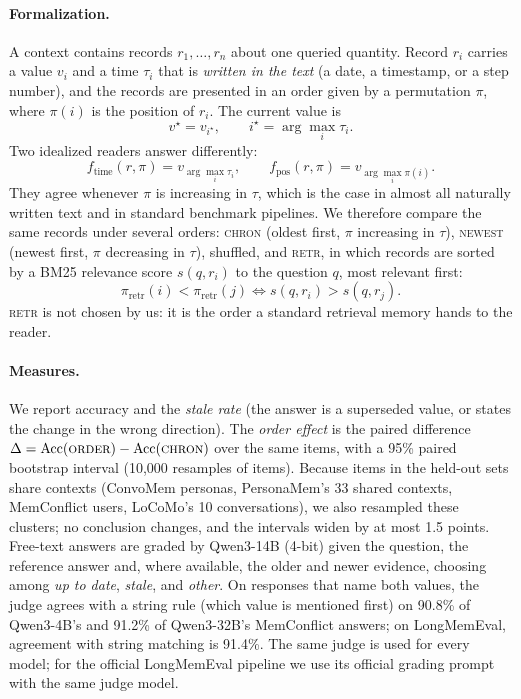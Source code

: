 \documentclass[11pt]{article}
\newcommand{\chrono}{\textsc{chron}}
\newcommand{\rev}{\textsc{newest}}
\newcommand{\retr}{\textsc{retr}}
\begin{document}
\paragraph{Formalization.}
A context contains records $r_1,\dots,r_n$ about one queried quantity. Record $r_i$ carries a value $v_i$ and a time $\tau_i$ that is \emph{written in the text} (a date, a timestamp, or a step number), and the records are presented in an order given by a permutation $\pi$, where $\pi(i)$ is the position of $r_i$. The current value is
\begin{equation}
  v^\star = v_{i^\star}, \qquad i^\star = \arg\max_i \tau_i .
\end{equation}
Two idealized readers answer differently:
\begin{equation}
  f_{\text{time}}(r,\pi) = v_{\arg\max_i \tau_i}, \qquad
  f_{\text{pos}}(r,\pi) = v_{\arg\max_i \pi(i)} .
\end{equation}
They agree whenever $\pi$ is increasing in $\tau$, which is the case in almost all naturally written text and in standard benchmark pipelines. We therefore compare the same records under several orders:
\chrono{} (oldest first, $\pi$ increasing in $\tau$), \rev{} (newest first, $\pi$ decreasing in $\tau$), shuffled, and \retr{}, in which records are sorted by a BM25 relevance score $s(q, r_i)$ to the question $q$, most relevant first:
\begin{equation}
  \pi_{\text{retr}}(i) < \pi_{\text{retr}}(j) \iff s(q,r_i) > s(q,r_j).
\end{equation}
\retr{} is not chosen by us: it is the order a standard retrieval memory hands to the reader.

\paragraph{Measures.}
We report accuracy and the \emph{stale rate} (the answer is a superseded value, or states the change in the wrong direction).
The \emph{order effect} is the paired difference $\Delta = \mathrm{Acc}(\textsc{order}) - \mathrm{Acc}(\chrono)$ over the same items, with a 95\% paired bootstrap interval (10{,}000 resamples of items). Because items in the held-out sets share contexts (ConvoMem personas, PersonaMem's 33 shared contexts, MemConflict users, LoCoMo's 10 conversations), we also resampled these clusters; no conclusion changes, and the intervals widen by at most 1.5 points.
Free-text answers are graded by Qwen3-14B (4-bit) given the question, the reference answer and, where available, the older and newer evidence, choosing among \emph{up to date}, \emph{stale}, and \emph{other}. On responses that name both values, the judge agrees with a string rule (which value is mentioned first) on 90.8\% of Qwen3-4B's and 91.2\% of Qwen3-32B's MemConflict answers; on LongMemEval, agreement with string matching is 91.4\%. The same judge is used for every model; for the official LongMemEval pipeline we use its official grading prompt with the same judge model.
\end{document}
